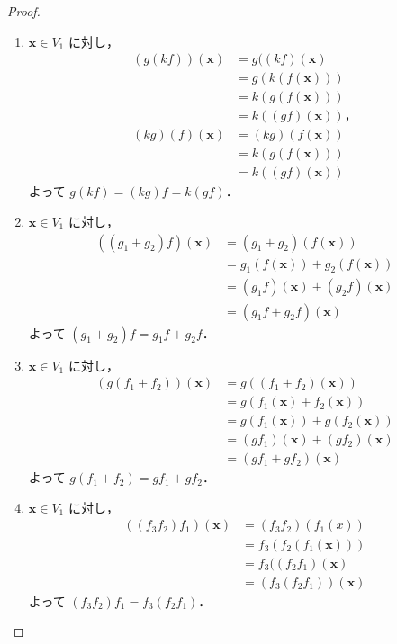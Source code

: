 \documentclass{jlreq}
\theoremstyle{definition}
\begin{document}
      \begin{proof}
        \mbox{}
        \begin{enumerate}
          \item $\bm{x} \in V_1$ に対し，
            \begin{align*}
              (g(kf))(\bm{x}) &= g((kf)(\bm{x}) \\
              &= g(k(f(\bm{x}))) \\
              &= k(g(f(\bm{x}))) \\
              &= k((gf)(\bm{x}))，\\
              (kg)(f)(\bm{x}) &= (kg)(f(\bm{x})) \\
              &= k(g(f(\bm{x}))) \\
              &= k((gf)(\bm{x}))
            \end{align*}
            よって $g(kf)=(kg)f=k(gf)$．
          \item $\bm{x} \in V_1$ に対し，
            \begin{align*}
              ((g_1+g_2)f)(\bm{x}) &= (g_1+g_2)(f(\bm{x})) \\
              &= g_1(f(\bm{x}))+g_2(f(\bm{x})) \\
              &= (g_1f)(\bm{x})+(g_2f)(\bm{x}) \\
              &= (g_1f+g_2f)(\bm{x})
            \end{align*}
            よって $(g_1+g_2)f=g_1f+g_2f$．
          \item $\bm{x} \in V_1$ に対し，
            \begin{align*}
              (g(f_1+f_2))(\bm{x}) &= g((f_1+f_2)(\bm{x})) \\
              &= g(f_1(\bm{x})+f_2(\bm{x})) \\
              &= g(f_1(\bm{x}))+g(f_2(\bm{x})) \\
              &= (gf_1)(\bm{x})+(gf_2)(\bm{x}) \\
              &= (gf_1+gf_2)(\bm{x})
            \end{align*}
            よって $g(f_1+f_2)=gf_1+gf_2$．
          \item $\bm{x} \in V_1$ に対し，
            \begin{align*}
               ((f_3f_2)f_1)(\bm{x}) &= (f_3f_2)(f_1(x)) \\
               &= f_3(f_2(f_1(\bm{x}))) \\
               &= f_3((f_2f_1)(\bm{x}) \\
               &= (f_3(f_2f_1))(\bm{x})
            \end{align*}
            よって $(f_3f_2)f_1=f_3(f_2f_1)$．
        \end{enumerate}
      \end{proof}
\end{document}
